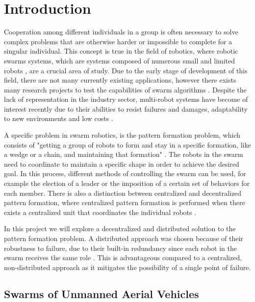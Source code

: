 \tableofcontents

\listoffigures

\chapter{Introduction}

Cooperation among different individuals in a group is often necessary to solve complex problems
that are otherwise harder or impossible to complete for a singular individual. This concept is
true in the field of robotics, where robotic swarms systems, which are systems composed of
numerous small and limited robots \autocite{HO17}, are a crucial area of study. Due to the early
stage of development of this field, there are not many currently existing applications, however
there exists many research projects to test the capabilities of swarm algorithms \autocite{MS20}.
Despite the lack of representation in the industry sector, multi-robot systems have become of
interest recently due to their abilities to resist failures and damages, adaptability to new
environments and low costs \autocite{HO17}.

A specific problem in swarm robotics, is the pattern formation problem, which consists of
"getting a group of robots to form and stay in a specific formation, like a wedge or a chain,
and maintaining that formation" \autocite{LS22}. The robots in the swarm need to coordinate
to maintain a specific shape in order to achieve the desired goal. In this process, different
methods of controlling the swarm can be used, for example the election of a leader or the 
imposition of a certain set of behaviors for each member. There is also a 
distinction between centralized and decentralized pattern formation, where centralized pattern
formation is performed when there exists a centralized unit that coordinates the individual
robots \autocite{HO17}.

In this project we will explore a decentralized and distributed solution to the pattern formation problem.
A distributed approach was chosen because of their robustness to failure, due to their
built-in redundancy since each robot in the swarm receives the same role \autocite{HO17}.
This is advantageous compared to a centralized, non-distributed approach as it
mitigates the possibility of a single point of failure.


\section{Swarms of Unmanned Aerial Vehicles}

